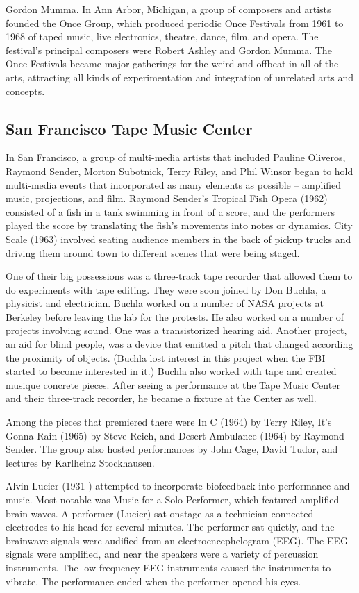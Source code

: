Gordon Mumma. In Ann Arbor, Michigan, a group of composers and artists founded the Once Group, which produced periodic Once Festivals from 1961 to 1968 of taped music, live electronics, theatre, dance, film, and opera. The festival's principal composers were Robert Ashley and Gordon Mumma. The Once Festivals became major gatherings for the weird and offbeat in all of the arts, attracting all kinds of experimentation and integration of unrelated arts and concepts.


\subsection{San Francisco Tape Music Center}
In San Francisco, a group of multi-media artists that included Pauline Oliveros, Raymond Sender, Morton Subotnick, Terry Riley, and Phil Winsor began to hold multi-media events that incorporated as many elements as possible -- amplified music, projections, and film. Raymond Sender's Tropical Fish Opera (1962) consisted of a fish in a tank swimming in front of a score, and the performers played the score by translating the fish's movements into notes or dynamics. City Scale (1963) involved seating audience members in the back of pickup trucks and driving them around town to different scenes that were being staged.

One of their big possessions was a three-track tape recorder that allowed them to do experiments with tape editing. They were soon joined by Don Buchla, a physicist and electrician. Buchla worked on a number of NASA projects at Berkeley before leaving the lab for the protests. He also worked on a number of projects involving sound. One was a transistorized hearing aid. Another project, an aid for blind people, was a device that emitted a pitch that changed according the proximity of objects. (Buchla lost interest in this project when the FBI started to become interested in it.) Buchla also worked with tape and created musique concrete pieces. After seeing a performance at the Tape Music Center and their three-track recorder, he became a fixture at the Center as well.

Among the pieces that premiered there were In C (1964) by Terry Riley, It's Gonna Rain (1965) by Steve Reich, and Desert Ambulance (1964) by Raymond Sender. The group also hosted performances by John Cage, David Tudor, and lectures by Karlheinz Stockhausen.

Alvin Lucier (1931-) attempted to incorporate biofeedback into performance and music. Most notable was Music for a Solo Performer, which featured amplified brain waves. A performer (Lucier) sat onstage as a technician connected electrodes to his head for several minutes. The performer sat quietly, and the brainwave signals were audified from an electroencephelogram (EEG). The EEG signals were amplified, and near the speakers were a variety of percussion instruments. The low frequency EEG instruments caused the instruments to vibrate. The performance ended when the performer opened his eyes.

